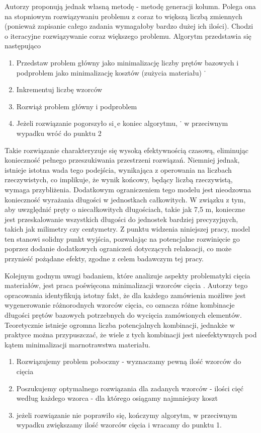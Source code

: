 Autorzy proponują jednak własną metodę - metodę generacji kolumn. Polega ona na stopniowym rozwiązywaniu problemu z coraz to większą liczbą zmiennych (ponieważ zapisanie całego zadania wymagałoby bardzo dużej ich ilości). Chodzi o iteracyjne rozwiązywanie coraz większego problemu. Algorytm przedstawia się następująco

\begin{enumerate}
\item Przedstaw problem główny jako minimalizację liczby prętów bazowych i podproblem jako minimalizację kosztów (zużycia materiału) ˙
\item Inkrementuj liczbę wzorców
\item Rozwiąż problem główny i podproblem
\item Jeżeli rozwiązanie pogorszyło si˛e koniec algorytmu, ˙
w przeciwnym wypadku wróć do punktu 2
\end{enumerate}

Takie rozwiązanie charakteryzuje się wysoką efektywnością czasową, eliminując konieczność pełnego przeszukiwania przestrzeni rozwiązań. Niemniej jednak, istnieje istotna wada tego podejścia, wynikająca z operowania na liczbach rzeczywistych, co implikuje, że wynik końcowy, będący liczbą rzeczywistą, wymaga przybliżenia. Dodatkowym ograniczeniem tego modelu jest nieodzowna konieczność wyrażania długości w jednostkach całkowitych. W związku z tym, aby uwzględnić pręty o niecałkowitych długościach, takie jak 7,5 m, konieczne jest przeskalowanie wszystkich długości do jednostek bardziej precyzyjnych, takich jak milimetry czy centymetry. Z punktu widzenia niniejszej pracy, model ten stanowi solidny punkt wyjścia, pozwalając na potencjalne rozwinięcie go poprzez dodanie dodatkowych ograniczeń dotyczących relaksacji, co może przynieść pożądane efekty, zgodne z celem badawczym tej pracy.

Kolejnym godnym uwagi badaniem, które analizuje aspekty problematyki cięcia materiałów, jest praca poświęcona minimalizacji wzorców cięcia \cite{patterns-reduction}. Autorzy tego opracowania identyfikują istotny fakt, że dla każdego zamówienia możliwe jest wygenerowanie różnorodnych wzorców cięcia, co oznacza różne kombinacje długości prętów bazowych potrzebnych do wycięcia zamówionych elementów. Teoretycznie istnieje ogromna liczba potencjalnych kombinacji, jednakże w praktyce można przypuszczać, że wiele z tych kombinacji jest nieefektywnych pod kątem minimalizacji marnotrawstwa materiału.

\begin{enumerate}
  \item Rozwiązujemy problem poboczny - wyznaczamy pewną ilość wzorców do cięcia
  \item Poszukujemy optymalnego rozwiązania dla zadanych wzorców - ilości cięć według każdego wzorca - dla którego osiągamy najmniejszy koszt
  \item jeżeli rozwiązanie nie poprawiło się, kończymy algorytm, w przeciwnym wypadku zwiększamy ilość wzorców cięcia i wracamy do punktu 1.
\end{enumerate}

